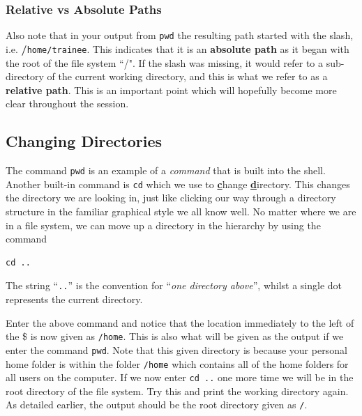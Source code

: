 \documentclass[a4paper,12pt,twoside]{memoir}
\begin{document}
\subsubsection*{Relative vs Absolute Paths}
\begin{information}
Also note that in your output from \texttt{pwd} the resulting path started with the slash, i.e. \textbf{/}\texttt{home/trainee}.
This indicates that it is an \textbf{absolute path} as it began with the root of the file system ``/".
If the slash was missing, it would refer to a sub-directory of the current working directory, and this is what we refer to as a \textbf{relative path}.
This is an important point which will hopefully become more clear throughout the session.
\end{information}

\subsection{Changing Directories}
\begin{information}
The command \texttt{pwd} is an example of a \textit{command} that is built into the shell.
Another built-in command is \texttt{cd} which we use to \textbf{\underline{c}}hange \textbf{\underline{d}}irectory.
This changes the directory we are looking in, just like clicking our way through a directory structure in the familiar graphical style we all know well.
No matter where we are in a file system, we can move up a directory in the hierarchy by using the command 
\begin{lstlisting}
cd ..
\end{lstlisting}
The string ``\texttt{..}'' is the convention for ``\textit{one directory above}'', whilst a single dot represents the current directory. \\
\end{information}

\begin{steps}
Enter the above command and notice that the location immediately to the left of the \$ is now given as \texttt{/home}.
This is also what will be given as the output if we enter the command \texttt{pwd}.
Note that this given directory is because your personal home folder is within the folder \texttt{/home} which contains all of the home folders for all users on the computer.
If we now enter \texttt{cd ..} one more time we will be in the root directory of the file system.
Try this and print the working directory again.
As detailed earlier, the output should be the root directory given as \texttt{/}. \\
\end{steps}
\end{document}
